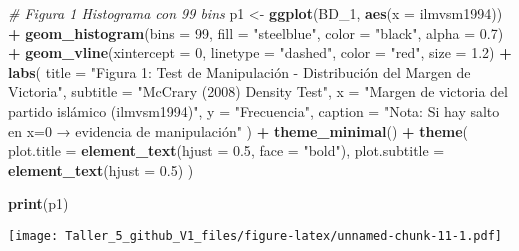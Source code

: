 \documentclass[
]{article}
\newenvironment{Shaded}{\begin{snugshade}}{\end{snugshade}}
\newcommand{\AttributeTok}[1]{\textcolor[rgb]{0.13,0.29,0.53}{#1}}
\newcommand{\CommentTok}[1]{\textcolor[rgb]{0.56,0.35,0.01}{\textit{#1}}}
\newcommand{\DecValTok}[1]{\textcolor[rgb]{0.00,0.00,0.81}{#1}}
\newcommand{\FloatTok}[1]{\textcolor[rgb]{0.00,0.00,0.81}{#1}}
\newcommand{\FunctionTok}[1]{\textcolor[rgb]{0.13,0.29,0.53}{\textbf{#1}}}
\newcommand{\NormalTok}[1]{#1}
\newcommand{\OtherTok}[1]{\textcolor[rgb]{0.56,0.35,0.01}{#1}}
\newcommand{\SpecialCharTok}[1]{\textcolor[rgb]{0.81,0.36,0.00}{\textbf{#1}}}
\newcommand{\StringTok}[1]{\textcolor[rgb]{0.31,0.60,0.02}{#1}}
\begin{document}
\begin{Shaded}
\begin{Highlighting}[]
\CommentTok{\# Figura 1 Histograma con 99 bins}
\NormalTok{p1 }\OtherTok{\textless{}{-}} \FunctionTok{ggplot}\NormalTok{(BD\_1, }\FunctionTok{aes}\NormalTok{(}\AttributeTok{x =}\NormalTok{ ilmvsm1994)) }\SpecialCharTok{+}
  \FunctionTok{geom\_histogram}\NormalTok{(}\AttributeTok{bins =} \DecValTok{99}\NormalTok{, }\AttributeTok{fill =} \StringTok{"steelblue"}\NormalTok{, }\AttributeTok{color =} \StringTok{"black"}\NormalTok{, }\AttributeTok{alpha =} \FloatTok{0.7}\NormalTok{) }\SpecialCharTok{+}
  \FunctionTok{geom\_vline}\NormalTok{(}\AttributeTok{xintercept =} \DecValTok{0}\NormalTok{, }\AttributeTok{linetype =} \StringTok{"dashed"}\NormalTok{, }\AttributeTok{color =} \StringTok{"red"}\NormalTok{, }\AttributeTok{size =} \FloatTok{1.2}\NormalTok{) }\SpecialCharTok{+}
  \FunctionTok{labs}\NormalTok{(}
    \AttributeTok{title =} \StringTok{"Figura 1: Test de Manipulación {-} Distribución del Margen de Victoria"}\NormalTok{,}
    \AttributeTok{subtitle =} \StringTok{"McCrary (2008) Density Test"}\NormalTok{,}
    \AttributeTok{x =} \StringTok{"Margen de victoria del partido islámico (ilmvsm1994)"}\NormalTok{,}
    \AttributeTok{y =} \StringTok{"Frecuencia"}\NormalTok{,}
    \AttributeTok{caption =} \StringTok{"Nota: Si hay salto en x=0 → evidencia de manipulación"}
\NormalTok{  ) }\SpecialCharTok{+}
  \FunctionTok{theme\_minimal}\NormalTok{() }\SpecialCharTok{+}
  \FunctionTok{theme}\NormalTok{(}
    \AttributeTok{plot.title =} \FunctionTok{element\_text}\NormalTok{(}\AttributeTok{hjust =} \FloatTok{0.5}\NormalTok{, }\AttributeTok{face =} \StringTok{"bold"}\NormalTok{),}
    \AttributeTok{plot.subtitle =} \FunctionTok{element\_text}\NormalTok{(}\AttributeTok{hjust =} \FloatTok{0.5}\NormalTok{)}
\NormalTok{  )}

\FunctionTok{print}\NormalTok{(p1)}
\end{Highlighting}
\end{Shaded}

\texttt{[image: Taller\_5\_github\_V1\_files/figure-latex/unnamed-chunk-11-1.pdf]}
\end{document}
